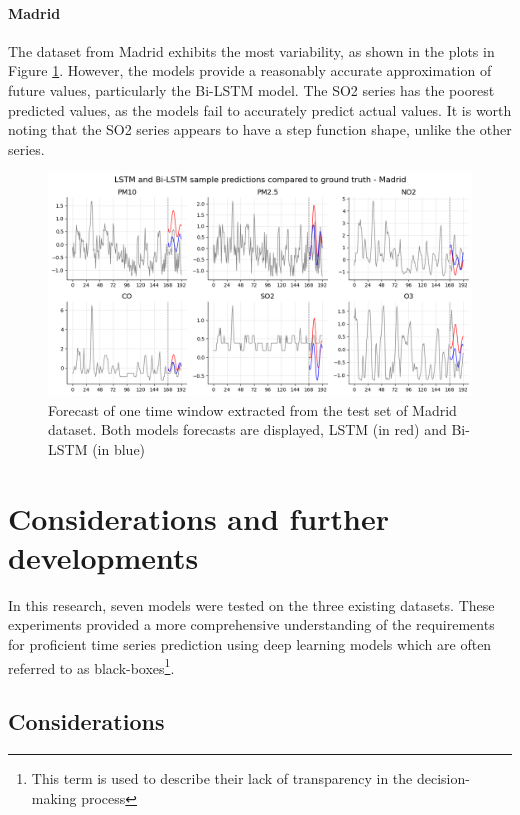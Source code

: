 \paragraph{Madrid}
The dataset from Madrid exhibits the most variability, as shown in the plots in Figure \ref{fig:forecasts_Madrid}. However, the models provide a reasonably accurate approximation of future values, particularly the Bi-LSTM model. The SO2 series has the poorest predicted values, as the models fail to accurately predict actual values. It is worth noting that the SO2 series appears to have a step function shape, unlike the other series.

\begin{figure}[h]
    \centering
    \includegraphics[width=1\linewidth]{images/Results/forecasts_madrid.png}
    \caption{Forecast of one time window extracted from the test set of Madrid dataset. Both models forecasts are displayed, LSTM (in red) and Bi-LSTM (in blue)}
    \label{fig:forecasts_Madrid}
\end{figure}

\section{Considerations and further developments}

In this research, seven models were tested on the three existing datasets. These experiments provided a more comprehensive understanding of the requirements for proficient time series prediction using deep learning models which are often referred to as black-boxes\footnote{This term is used to describe their lack of transparency in the decision-making process}.

\subsection*{Considerations}

